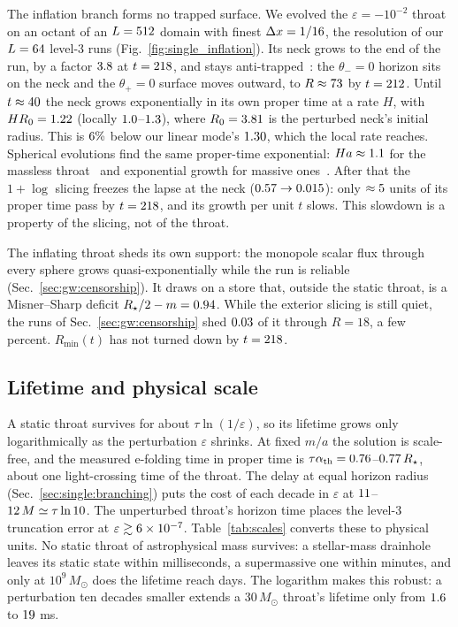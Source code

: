 \documentclass[twocolumn,floatfix,aps,prd,superscriptaddress,nofootinbib]{revtex4-2}
\begin{document}
The inflation branch forms no trapped surface. We evolved the $\varepsilon=-10^{-2}$ throat on an octant of an $L=512$ domain with finest $\Delta x=1/16$, the resolution of our $L=64$ level-3 runs (Fig.~\ref{fig:single_inflation}). Its neck grows to the end of the run, by a factor $3.8$ at $t=218$, and stays anti-trapped~\cite{hayward1999}: the $\theta_-=0$ horizon sits on the neck and the $\theta_+=0$ surface moves outward, to $R\approx73$ by $t=212$. Until $t\approx40$ the neck grows exponentially in its own proper time at a rate $H$, with $HR_0=1.22$ (locally $1.0$--$1.3$), where $R_0=3.81$ is the perturbed neck's initial radius. This is $6\%$ below our linear mode's $1.30$, which the local rate reaches. Spherical evolutions find the same proper-time exponential: $Ha\approx1.1$ for the massless throat~\cite{shinkai2002} and exponential growth for massive ones~\cite{gonzalez2009}. After that the $1{+}\log$ slicing freezes the lapse at the neck ($0.57\to0.015$): only $\approx5$ units of its proper time pass by $t=218$, and its growth per unit $t$ slows. This slowdown is a property of the slicing, not of the throat.

The inflating throat sheds its own support: the monopole scalar flux through every sphere grows quasi-exponentially while the run is reliable (Sec.~\ref{sec:gw:censorship}). It draws on a store that, outside the static throat, is a Misner--Sharp deficit $R_\star/2-m=0.94$. While the exterior slicing is still quiet, the runs of Sec.~\ref{sec:gw:censorship} shed $0.03$ of it through $R=18$, a few percent. $R_{\min}(t)$ has not turned down by $t=218$.

\subsection{Lifetime and physical scale}
\label{sec:single:lifetime}

A static throat survives for about $\tau\ln(1/\varepsilon)$, so its lifetime grows only logarithmically as the perturbation $\varepsilon$ shrinks. At fixed $m/a$ the solution is scale-free, and the measured e-folding time in proper time is $\tau\alpha_{\rm th}=0.76$--$0.77\,R_\star$, about one light-crossing time of the throat. The delay at equal horizon radius (Sec.~\ref{sec:single:branching}) puts the cost of each decade in $\varepsilon$ at $11$--$12\,M\simeq\tau\ln10$. The unperturbed throat's horizon time places the level-3 truncation error at $\varepsilon\gtrsim6\times10^{-7}$. Table~\ref{tab:scales} converts these to physical units. No static throat of astrophysical mass survives: a stellar-mass drainhole leaves its static state within milliseconds, a supermassive one within minutes, and only at $10^9\,M_\odot$ does the lifetime reach days. The logarithm makes this robust: a perturbation ten decades smaller extends a $30\,M_\odot$ throat's lifetime only from $1.6$ to $19$ ms.
\end{document}
